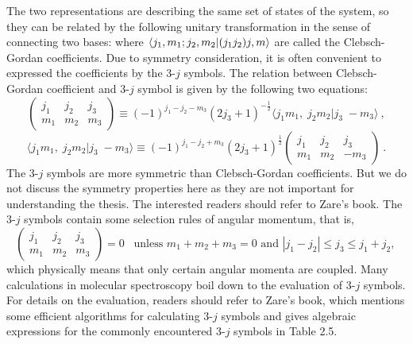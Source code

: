 The two representations are describing the same set of states of the system, so they can be related by the following unitary
transformation in the sense of connecting two bases:
where $\langle j_1, m_1; j_2, m_2 | (j_1 j_2)j, m \rangle$ are called the Clebsch-Gordan coefficients. Due to symmetry 
consideration, it is often convenient to expressed the coefficients by the 3-$j$ symbols. The relation between Clebsch-Gordan 
coefficient and 3-$j$ symbol is given by the following two equations:
\begin{equation}
\left( 
\begin{array}{ ccc }
j_{1} & j_{2} & j_{3} \\
m_{1} & m_{2} & m_{3}
\end{array}
\right) \equiv (-1)^{j_{1} - j_{2} - m_{3}} (2j_{3} +1)^{-\frac{1}{2}} \langle j_{1}m_{1}, \; j_{2} m_{2} | j_{3}\; -m_{3}\rangle \ ,
\end{equation}
\begin{equation}
 \langle j_{1}m_{1}, \; j_{2} m_{2} | j_{3}\; -m_{3}\rangle \equiv (-1)^{j_{1} - j_{2} + m_{3}} (2j_{3} +1)^{\frac{1}{2}}
\left( 
\begin{array}{ ccc }
j_{1} & j_{2} & j_{3} \\
m_{1} & m_{2} & -m_{3}
\end{array}
\right)  \ . \label{CG-3j}
\end{equation}
The 3-$j$ symbols are more symmetric than Clebsch-Gordan coefficients. But we do not discuss the symmetry properties here as they are not important for understanding the thesis. The interested readers should refer to Zare's book\cite{zare-book}.  The 3-$j$ symbols contain some selection rules of angular momentum, that is, 
\begin{equation}
\left(
\begin{array}{ccc}
j_{1}&j_{2}&j_{3} \\
m_{1}&m_{2}&m_{3}
\end{array}
\right)
=0 \;\;\; \mbox{unless $m_{1} + m_{2} + m_{3} = 0$ and $|j_1 - j_2| \leq j_3 \leq j_1 + j_2$, } \nonumber 
\end{equation}
which physically means that only certain angular momenta are coupled. Many calculations in molecular spectroscopy boil
down to the evaluation of 3-$j$ symbols. For details on the evaluation, readers should refer to Zare's book\cite{zare-book}, which mentions some efficient algorithms for calculating 3-$j$ 
symbols and gives algebraic expressions for the commonly encountered 3-$j$ symbols in Table 2.5. 
 

